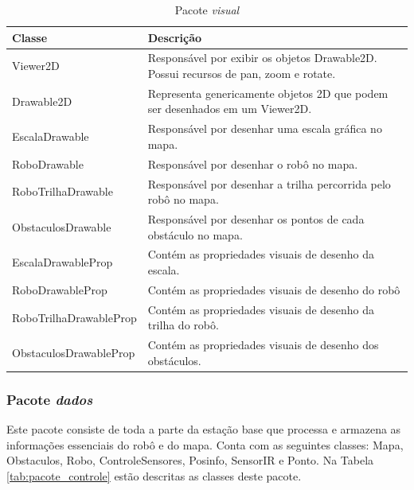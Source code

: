\begin{table}[H]
  \centering
  \caption{Pacote \textit{visual}}
  \begin{tabular}{p{6cm}p{8cm}}
    \toprule
    \textbf{Classe} & \textbf{Descrição} \\
    \midrule
    Viewer2D & Responsável por exibir os objetos Drawable2D. Possui recursos de pan, zoom e rotate.   \\ \hline
    Drawable2D & Representa genericamente objetos 2D que podem ser desenhados em um Viewer2D. \\ \hline
    EscalaDrawable & Responsável por desenhar uma escala gráfica no mapa. \\ \hline
    RoboDrawable & Responsável por desenhar o robô no mapa. \\ \hline
    RoboTrilhaDrawable & Responsável por desenhar a trilha percorrida pelo robô no mapa. \\ \hline
    ObstaculosDrawable & Responsável por desenhar os pontos de cada obstáculo no mapa. \\ \hline
    EscalaDrawableProp & Contém as propriedades visuais de desenho da escala. \\ \hline
    RoboDrawableProp & Contém as propriedades visuais de desenho do robô \\ \hline
    RoboTrilhaDrawableProp & Contém as propriedades visuais de desenho da trilha do robô. \\ \hline
    ObstaculosDrawableProp & Contém as propriedades visuais de desenho dos obstáculos. \\
    \bottomrule
  \end{tabular}%
  \label{tab:pacote_visual}%
\end{table}%

\subsubsection{Pacote \textit{dados}}

Este pacote consiste de toda a parte da estação base que processa e armazena as informações essenciais do robô e do mapa. Conta com as seguintes classes: Mapa, Obstaculos, Robo, ControleSensores, Posinfo, SensorIR e Ponto. Na Tabela \ref{tab:pacote_controle} estão descritas as classes deste pacote.

